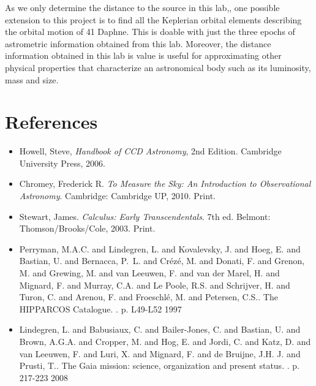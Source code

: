 \documentclass[authoryear, 12pt,5p, times]{elsarticle}
\begin{document}
As we only  determine the distance to the source in this lab,, one possible extension to this project is to find all the Keplerian orbital elements describing the orbital motion of 41 Daphne. This is doable with just the three epochs of astrometric information obtained from this lab. Moreover, the distance information obtained in this lab is value is useful for approximating other physical properties that characterize an astronomical body such as its luminosity, mass and size.
 \section*{References}

 \begin{footnotesize}
 \begin{itemize}
\item Howell, Steve,  \textit{Handbook of CCD Astronomy}, 2nd Edition. Cambridge University Press, 2006.
\item Chromey, Frederick R. \textit{To Measure the Sky: An Introduction to Observational Astronomy}. Cambridge: Cambridge UP, 2010. Print.
\item Stewart, James. \textit{Calculus: Early Transcendentals}. 7th ed. Belmont: Thomson/Brooks/Cole, 2003. Print.
\item Perryman, M.A.C. and Lindegren, L. and Kovalevsky, J. and Hoeg, E. and Bastian, U. and Bernacca, P.~L. and Cr{\'ez\'e}, M. and Donati, F. and Grenon, M. and Grewing, M. and van Leeuwen, F. and van der Marel, H. and Mignard, F. and Murray, C.A. and Le Poole, R.S. and Schrijver, H. and Turon, C. and Arenou, F. and Froeschl{\'e}, M. and Petersen, C.S.. The HIPPARCOS Catalogue. . p. L49-L52 1997
\item  Lindegren, L. and Babusiaux, C. and Bailer-Jones, C. and Bastian, U. and Brown, A.G.A. and Cropper, M. and Hog, E. and Jordi, C. and Katz, D. and van Leeuwen, F. and Luri, X. and Mignard, F. and de Bruijne, J.H. J. and Prusti, T.. The Gaia mission: science, organization and present status. . p. 217-223 2008
\end{itemize}
% 
%
  \end{footnotesize}
\end{document}
